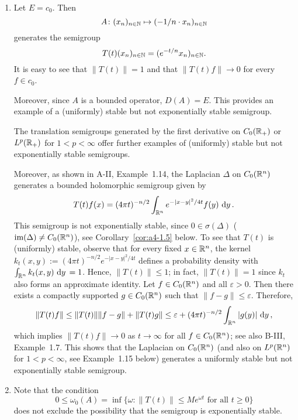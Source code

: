 \begin{example}\label{ex:a4-1.2}
\begin{enumerate}[\upshape (i), wide, labelsep=1em]

\item 
Let $E = c_{0}$. 
Then 
\[
A \colon (x_{n})_{n \in \mathbb{N}} \mapsto (-1/n \cdot x_{n})_{n \in \mathbb{N}}
\] 
generates the semigroup 
\[
T(t)(x_{n})_{n \in \mathbb{N}} = (e^{-t/n} x_{n})_{n \in \mathbb{N}}.
\]
It is easy to see that $\|T(t)\|=1$ and that $\|T(t)f\|\to 0$ for every $f \in c_{0}$.

Moreover, since $A$ is a bounded operator, $D(A) = E$.
This provides an example of a (uniformly) stable but not exponentially stable semigroup.

The translation semigroups generated by the first derivative on $C_0(\mathbb{R}_{+})$ or $L^{p}(\mathbb{R}_{+})$ for $1 < p < \infty$ offer further examples of (uniformly) stable but not exponentially stable semigroups.

Moreover, as shown in A-II, Example~1.14, the Laplacian $\Delta$ on $C_0(\mathbb{R}^{n})$ generates a bounded holomorphic semigroup given by
\[
T(t)f(x) = (4\pi t)^{-n/2} \int_{\mathbb{R}^{n}} e^{-|x-y|^{2}/4t} f(y) \,\mathop{}\!\mathrm{d}{y}\,.
\]
This semigroup is not exponentially stable, since $0 \in \sigma(\Delta)$ ($\textrm{im}(\Delta) \not= C_0(\mathbb{R}^{n})$), see Corollary~\ref{cor:a4-1.5} below. To see that $T(t)$ is (uniformly) stable, observe that for every fixed $x\in\mathbb{R}^n$, the kernel $k_t(x,y) := (4\pi t)^{-n/2} e^{-|x-y|^{2}/4t}$ defines a probability density with $\int_{\mathbb{R}^n} k_t(x,y)\,\mathop{}\!\mathrm{d}{y}\, = 1$. Hence, $\|T(t)\| \le 1$; in fact, $\|T(t)\| = 1$ since $k_t$ also forms an approximate identity. Let $f \in C_0(\mathbb{R}^{n})$ and all $\varepsilon > 0$. Then there exists a compactly supported $g \in C_0(\mathbb{R}^{n})$ such that $\|f-g\| \le \varepsilon$. Therefore,
\[
\|T(t)f\| \le  \|T(t)\|\|f-g\| + \|T(t)g\| \le \varepsilon + (4\pi t)^{-n/2} \int_{\mathbb{R}^{n}} |g(y)| \,\mathop{}\!\mathrm{d}{y}\, ,
\]
which implies  $\|T(t)f\| \to 0$ as $t\to\infty$ for all $f \in C_0(\mathbb{R}^{n})$; see also B-III, Example~1.7.
This shows that the Laplacian on $C_0(\mathbb{R}^{n})$ (and also on $L^{p}(\mathbb{R}^{n})$ for $1 < p < \infty$, see Example~1.15 below) generates a uniformly stable but not exponentially stable semigroup.

\item 
Note that the condition 
\[
0 \leq \omega_{0}(A) = \inf\{\omega\colon\|T(t)\| \leq Me^{\omega t} \text{ for all } t \geq 0\}
\]
does not exclude the possibility that the semigroup is exponentially stable.


\end{enumerate}
\end{example}
